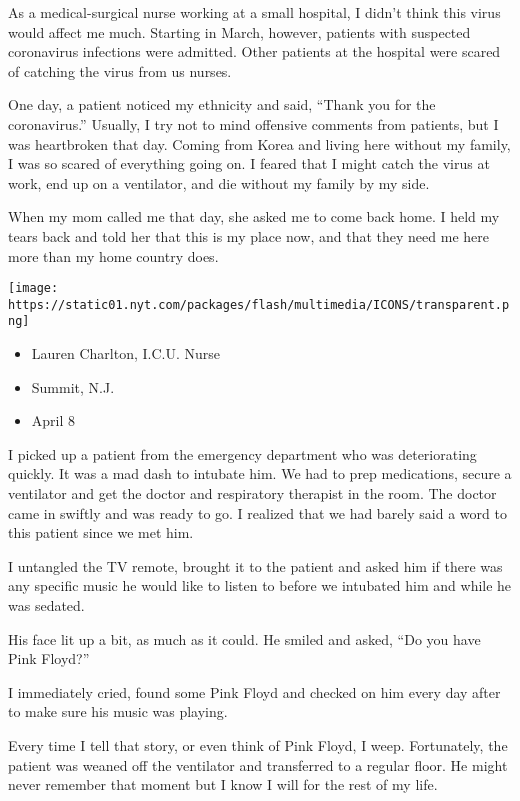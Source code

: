 As a medical-surgical nurse working at a small hospital, I didn't think
this virus would affect me much. Starting in March, however, patients
with suspected coronavirus infections were admitted. Other patients at
the hospital were scared of catching the virus from us nurses.

One day, a patient noticed my ethnicity and said, ``Thank you for the
coronavirus.'' Usually, I try not to mind offensive comments from
patients, but I was heartbroken that day. Coming from Korea and living
here without my family, I was so scared of everything going on. I feared
that I might catch the virus at work, end up on a ventilator, and die
without my family by my side.

When my mom called me that day, she asked me to come back home. I held
my tears back and told her that this is my place now, and that they need
me here more than my home country does.

\texttt{[image: https://static01.nyt.com/packages/flash/multimedia/ICONS/transparent.png]}

\begin{itemize}
\tightlist
\item
  Lauren Charlton, I.C.U. Nurse
\item
  Summit, N.J.
\item
  April 8
\end{itemize}

I picked up a patient from the emergency department who was
deteriorating quickly. It was a mad dash to intubate him. We had to prep
medications, secure a ventilator and get the doctor and respiratory
therapist in the room. The doctor came in swiftly and was ready to go. I
realized that we had barely said a word to this patient since we met
him.

I untangled the TV remote, brought it to the patient and asked him if
there was any specific music he would like to listen to before we
intubated him and while he was sedated.

His face lit up a bit, as much as it could. He smiled and asked, ``Do
you have Pink Floyd?''

I immediately cried, found some Pink Floyd and checked on him every day
after to make sure his music was playing.

Every time I tell that story, or even think of Pink Floyd, I weep.
Fortunately, the patient was weaned off the ventilator and transferred
to a regular floor. He might never remember that moment but I know I
will for the rest of my life.

